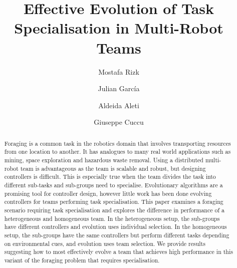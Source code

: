 \documentclass[sigconf]{aamas}  %
\begin{document}
\title{Effective Evolution of Task Specialisation in Multi-Robot Teams}  

 \author{Mostafa Rizk}

 \author{Julian Garc\'ia}

 \author{Aldeida Aleti}
 
  \author{Giuseppe Cuccu}



\begin{abstract}  %

Foraging is a common task in the robotics domain that involves transporting resources from one location to another. It has analogues to many real world applications such as mining, space exploration and hazardous waste removal. Using a distributed multi-robot team is advantageous as the team is scalable and robust, but designing controllers is difficult. This is especially true when the team divides the task into different sub-tasks and sub-groups need to specialise. Evolutionary algorithms are a promising tool for controller design, however little work has been done evolving controllers for teams performing task specialisation. This paper examines a foraging scenario requiring task specialisation and explores the difference in performance of a heterogeneous and homogeneous team. In the heterogeneous setup, the sub-groups have different controllers and evolution uses individual selection. In the homogeneous setup, the sub-groups have the same controllers but perform different tasks depending on environmental cues, and evolution uses team selection. We provide results suggesting how to most effectively evolve a team that achieves high performance in this variant of the foraging problem that requires specialisation.

\end{abstract}
\end{document}
